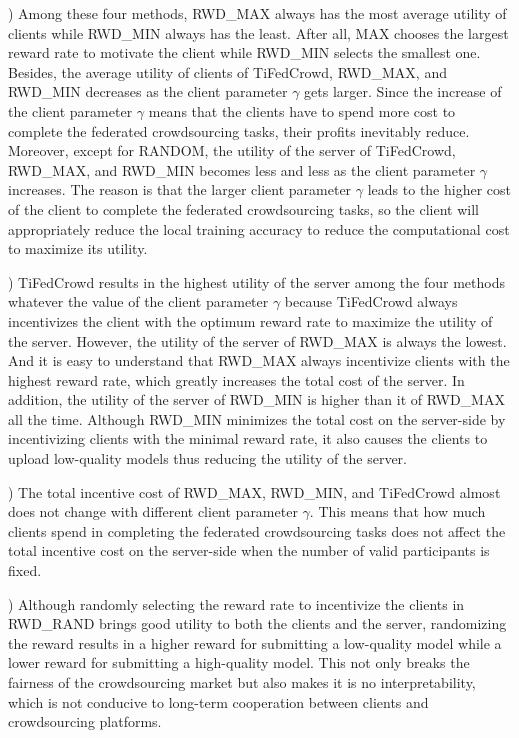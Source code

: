 \documentclass[final,1p,times]{elsarticle}
\begin{document}
\lowercase{}) Among these four methods, RWD\_MAX always has the most average utility of clients while RWD\_MIN always has the least. After all, MAX chooses the largest reward rate to motivate the client while RWD\_MIN selects the smallest one. Besides, the average utility of clients of TiFedCrowd, RWD\_MAX, and RWD\_MIN decreases as the client parameter $\gamma$ gets larger. Since the increase of the client parameter $\gamma$ means that the clients have to spend more cost to complete the federated crowdsourcing tasks, their profits inevitably reduce. Moreover, except for RANDOM, the utility of the server of TiFedCrowd, RWD\_MAX, and RWD\_MIN becomes less and less as the client parameter $\gamma$ increases. The reason is that the larger client parameter $\gamma$ leads to the higher cost of the client to complete the federated crowdsourcing tasks, so the client will appropriately reduce the local training accuracy to reduce the computational cost to maximize its utility.

\lowercase{}) TiFedCrowd results in the highest utility of the server among the four methods whatever the value of the client parameter $\gamma$ because TiFedCrowd always incentivizes the client with the optimum reward rate to maximize the utility of the server. However, the utility of the server of RWD\_MAX is always the lowest. And it is easy to understand that RWD\_MAX always incentivize clients with the highest reward rate, which greatly increases the total cost of the server. In addition, the utility of the server of RWD\_MIN is higher than it of RWD\_MAX all the time. Although RWD\_MIN minimizes the total cost on the server-side by incentivizing clients with the minimal reward rate, it also causes the clients to upload low-quality models thus reducing the utility of the server. 

\lowercase{}) The total incentive cost of RWD\_MAX, RWD\_MIN, and TiFedCrowd almost does not change with different client parameter $\gamma$. This means that how much clients spend in completing the federated crowdsourcing tasks does not affect the total incentive cost on the server-side when the number of valid participants is fixed.

\lowercase{}) Although randomly selecting the reward rate to incentivize the clients in RWD\_RAND brings good utility to both the clients and the server, randomizing the reward results in a higher reward for submitting a low-quality model while a lower reward for submitting a high-quality model. This not only breaks the fairness of the crowdsourcing market but also makes it is no interpretability, which is not conducive to long-term cooperation between clients and crowdsourcing platforms.
\end{document}
